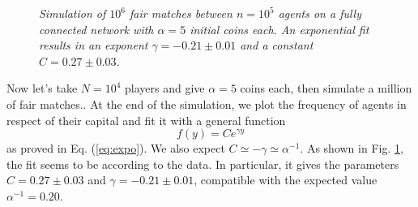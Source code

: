 \begin{figure}[ht!]
    \centering
    \scalebox{.7}{}
    \caption{\emph{Simulation of $10^6$ fair matches between $n = 10^5$ agents on a fully connected network with $\alpha = 5$ initial coins each. 
                    An exponential fit results in an exponent $\gamma = -0.21 \pm 0.01$ and a constant $C = 0.27 \pm 0.03$.}}
    \label{fig:expo}
\end{figure}
Now let's take $N = 10^4$ players and give $\alpha = 5$ coins each, then simulate a million of fair matches..
At the end of the simulation, we plot the frequency of agents in respect of their capital and fit \cite{root} it with a general function 
\begin{equation}
    f(y) = Ce^{\gamma y}
    \label{eq:generalExpo}
\end{equation}
as proved in Eq. (\ref{eq:expo}).
We  also expect $C \simeq -\gamma \simeq \alpha^{-1}$.
As shown in Fig. \ref{fig:expo}, the fit seems to be according to the data.
In particular, it gives the parameters $C = 0.27 \pm 0.03$ and $\gamma = -0.21 \pm 0.01$, compatible with the expected value $\alpha^{-1} = 0.20$.

